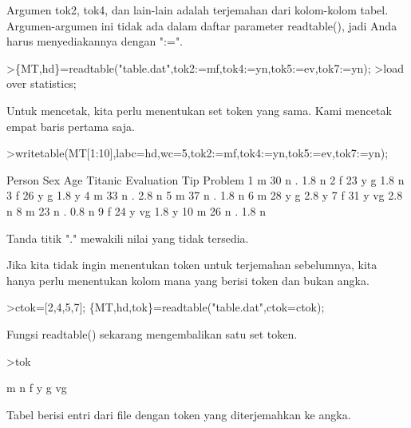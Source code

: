 \documentclass[a4paper,10pt]{article}
\begin{document}
\begin{eulernotebook}
\begin{eulercomment}
\begin{eulercomment}
\begin{eulercomment}
\begin{eulercomment}
\begin{eulercomment}
Argumen tok2, tok4, dan lain-lain adalah terjemahan dari kolom-kolom
tabel. Argumen-argumen ini tidak ada dalam daftar parameter
readtable(), jadi Anda harus menyediakannya dengan ":=".
\end{eulercomment}
\begin{eulerprompt}
>\{MT,hd\}=readtable("table.dat",tok2:=mf,tok4:=yn,tok5:=ev,tok7:=yn);
>load over statistics;
\end{eulerprompt}
\begin{eulercomment}
Untuk mencetak, kita perlu menentukan set token yang sama. Kami
mencetak empat baris pertama saja.
\end{eulercomment}
\begin{eulerprompt}
>writetable(MT[1:10],labc=hd,wc=5,tok2:=mf,tok4:=yn,tok5:=ev,tok7:=yn);
\end{eulerprompt}
\begin{euleroutput}
   Person  Sex  Age Titanic Evaluation  Tip Problem
        1    m   30       n          .  1.8       n
        2    f   23       y          g  1.8       n
        3    f   26       y          g  1.8       y
        4    m   33       n          .  2.8       n
        5    m   37       n          .  1.8       n
        6    m   28       y          g  2.8       y
        7    f   31       y         vg  2.8       n
        8    m   23       n          .  0.8       n
        9    f   24       y         vg  1.8       y
       10    m   26       n          .  1.8       n
\end{euleroutput}
\begin{eulercomment}
Tanda titik "." mewakili nilai yang tidak tersedia.

Jika kita tidak ingin menentukan token untuk terjemahan sebelumnya,
kita hanya perlu menentukan kolom mana yang berisi token dan bukan
angka.
\end{eulercomment}
\begin{eulerprompt}
>ctok=[2,4,5,7]; \{MT,hd,tok\}=readtable("table.dat",ctok=ctok);
\end{eulerprompt}
\begin{eulercomment}
Fungsi readtable() sekarang mengembalikan satu set token.
\end{eulercomment}
\begin{eulerprompt}
>tok
\end{eulerprompt}
\begin{euleroutput}
  m
  n
  f
  y
  g
  vg
\end{euleroutput}
\begin{eulercomment}
Tabel berisi entri dari file dengan token yang diterjemahkan ke angka.


\end{eulercomment}
\end{eulercomment}
\end{eulercomment}
\end{eulercomment}
\end{eulercomment}
\end{eulernotebook}
\end{document}

